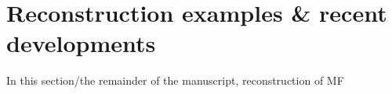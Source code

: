 \section{Reconstruction examples & recent developments}

In this section/the remainder of the manuscript, reconstruction of MF
